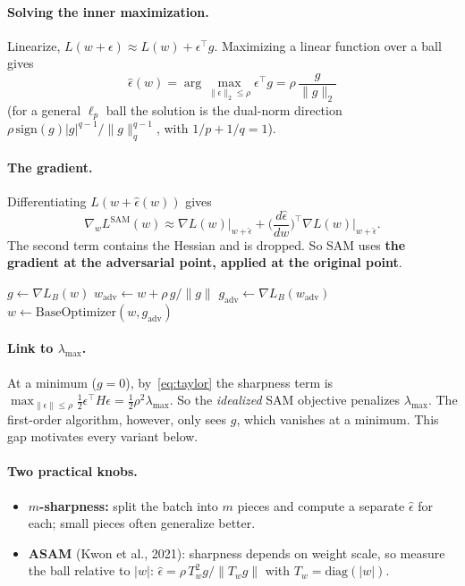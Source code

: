 \documentclass[11pt]{article}
\newcommand{\lmax}{\lambda_{\max}}
\newcommand{\gp}{g_{\mathrm{adv}}}
\theoremstyle{plain}
\begin{document}
\paragraph{Solving the inner maximization.} Linearize, $L(w+\epsilon) \approx L(w) + \epsilon^\top g$. Maximizing a linear function over a ball gives
\begin{equation}
  \hat\epsilon(w) = \arg\max_{\|\epsilon\|_2\le\rho} \epsilon^\top g = \rho\,\frac{g}{\|g\|_2}
\end{equation}
(for a general $\ell_p$ ball the solution is the dual-norm direction $\rho\,\mathrm{sign}(g)|g|^{q-1}/\|g\|_q^{q-1}$, with $1/p + 1/q = 1$).

\paragraph{The gradient.} Differentiating $L(w + \hat\epsilon(w))$ gives
\begin{equation}
  \nabla_w L^{\mathrm{SAM}}(w) \approx \nabla L(w)\big|_{w+\hat\epsilon} + \Big(\frac{d\hat\epsilon}{dw}\Big)^{\!\top} \nabla L(w)\big|_{w+\hat\epsilon}.
\end{equation}
The second term contains the Hessian and is dropped. So SAM uses \textbf{the gradient at the adversarial point, applied at the original point}.

\begin{algorithm}[h]
\caption{SAM (one step, any base optimizer)}
\begin{algorithmic}[1]
\State $g \gets \nabla L_B(w)$ 
\State $w_{\mathrm{adv}} \gets w + \rho\, g/\|g\|$ 
\State $\gp \gets \nabla L_B(w_{\mathrm{adv}})$ 
\State $w \gets \mathrm{BaseOptimizer}(w, \gp)$ \Comment{e.g.\ $w - \eta\,\gp$}
\end{algorithmic}
\end{algorithm}

\paragraph{Link to $\lmax$.} At a minimum ($g=0$), by~\eqref{eq:taylor} the sharpness term is $\max_{\|\epsilon\|\le\rho} \frac12\epsilon^\top H\epsilon = \frac12\rho^2\lmax$.
So the \emph{idealized} SAM objective penalizes $\lmax$. The first-order algorithm, however, only sees $g$, which vanishes at a minimum.
This gap motivates every variant below.

\paragraph{Two practical knobs.}
\begin{itemize}
  \item \textbf{$m$-sharpness:} split the batch into $m$ pieces and compute a separate $\hat\epsilon$ for each; small pieces often generalize better.
  \item \textbf{ASAM} (Kwon et al., 2021): sharpness depends on weight scale, so measure the ball relative to $|w|$:
        $\hat\epsilon = \rho\, T_w^2 g / \|T_w g\|$ with $T_w = \mathrm{diag}(|w|)$.
\end{itemize}
\end{document}
